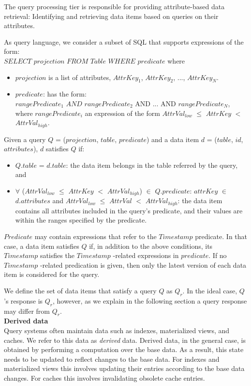 The query processing tier is responsible for providing attribute-based data retrieval:
Identifying and retrieving data items based on queries on their attributes.

As query language, we consider a subset of SQL that supports expressions of the form: \\

\noindent
$SELECT$ $projection$ $FROM$ $Table$ $WHERE$ $predicate$
\noindent
where
\begin{itemize}
  \item $projection$ is a list of attributes, $AttrKey_1$, $AttrKey_2$, ..., $AttrKey_N$.
  \item $predicate$: has the form: \\ $rangePredicate_1$ $AND$ $rangePredicate_2$ AND ... AND $rangePredicate_N$, \\
  where $rangePredicate_i$ an expression of the form $AttrVal_{low}$ $\leq$ $AttrKey$ $<$ $AttrVal_{high}$.
\end{itemize}

Given a query $Q$ = ($projection$, $table$, $predicate$)
and a data item $d$ = ($table$, $id$, $attributes$), $d$ satisfies $Q$ if:
\begin{itemize}
  \item $Q.table$ = $d.table$: the data item belongs in the table referred by the query, and
  \item $\forall$ ($AttrVal_{low}$ $\leq$ $AttrKey$ $<$ $AttrVal_{high}$) $\in$ $Q.predicate$:
  $attrKey$ $\in$ $d.attributes$ and $AttrVal_{low}$ $\leq$ $AttrVal$ $<$ $AttrVal_{high}$:
  the data item contains all attributes included in the query's predicate, and their values are within the ranges
  specified by the predicate.
\end{itemize}

$Predicate$ may contain expressions that refer to the $Timestamp$ predicate.
In that case, a data item satisfies $Q$ if, in addition to the above conditions, its $Timestamp$ satisfies the
$Timestamp$ -related expressions in $predicate$.
If no $Timestamp$ -related predication is given, then only the latest version of each data item is considered for the
query.

We define the set of data items that satisfy a query $Q$ as $Q_r$.
In the ideal case, $Q$'s response is $Q_r$, however, as we explain in the following section a query response may
differ from $Q_r$. \\

\noindent
\textbf{Derived data} \\
Query systems often maintain data such as indexes, materialized views, and caches.
We refer to this data as \textit{derived} data.
Derived data, in the general case, is obtained by performing a computation over the base data.
As a result, this state needs to be updated to reflect changes to the base data.
For indexes and materialized views this involves updating their entries according to the base data changes.
For caches this involves invalidating obsolete cache entries.

